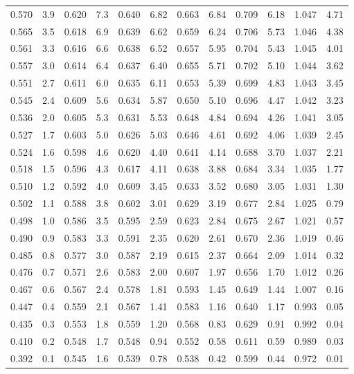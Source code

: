 \documentclass[a4paper,11pt]{article}
\begin{document}
\begin{table}[H]
{\begin{tabular}{|cc|cc|cc|cc|cc|cc|}
0.570 & 3.9 & 0.620 & 7.3 & 0.640 & 6.82 & 0.663 & 6.84 & 0.709 & 6.18 & 1.047 & 4.71 \\
0.565 & 3.5 & 0.618 & 6.9 & 0.639 & 6.62 & 0.659 & 6.24 & 0.706 & 5.73 & 1.046 & 4.38 \\
0.561 & 3.3 & 0.616 & 6.6 & 0.638 & 6.52 & 0.657 & 5.95 & 0.704 & 5.43 & 1.045 & 4.01 \\
0.557 & 3.0 & 0.614 & 6.4 & 0.637 & 6.40 & 0.655 & 5.71 & 0.702 & 5.10 & 1.044 & 3.62 \\
0.551 & 2.7 & 0.611 & 6.0 & 0.635 & 6.11 & 0.653 & 5.39 & 0.699 & 4.83 & 1.043 & 3.45 \\
0.545 & 2.4 & 0.609 & 5.6 & 0.634 & 5.87 & 0.650 & 5.10 & 0.696 & 4.47 & 1.042 & 3.23 \\
0.536 & 2.0 & 0.605 & 5.3 & 0.631 & 5.53 & 0.648 & 4.84 & 0.694 & 4.26 & 1.041 & 3.05 \\
0.527 & 1.7 & 0.603 & 5.0 & 0.626 & 5.03 & 0.646 & 4.61 & 0.692 & 4.06 & 1.039 & 2.45 \\
0.524 & 1.6 & 0.598 & 4.6 & 0.620 & 4.40 & 0.641 & 4.14 & 0.688 & 3.70 & 1.037 & 2.21 \\
0.518 & 1.5 & 0.596 & 4.3 & 0.617 & 4.11 & 0.638 & 3.88 & 0.684 & 3.34 & 1.035 & 1.77 \\
0.510 & 1.2 & 0.592 & 4.0 & 0.609 & 3.45 & 0.633 & 3.52 & 0.680 & 3.05 & 1.031 & 1.30 \\
0.502 & 1.1 & 0.588 & 3.8 & 0.602 & 3.01 & 0.629 & 3.19 & 0.677 & 2.84 & 1.025 & 0.79 \\
0.498 & 1.0 & 0.586 & 3.5 & 0.595 & 2.59 & 0.623 & 2.84 & 0.675 & 2.67 & 1.021 & 0.57 \\
0.490 & 0.9 & 0.583 & 3.3 & 0.591 & 2.35 & 0.620 & 2.61 & 0.670 & 2.36 & 1.019 & 0.46 \\
0.485 & 0.8 & 0.577 & 3.0 & 0.587 & 2.19 & 0.615 & 2.37 & 0.664 & 2.09 & 1.014 & 0.32 \\
0.476 & 0.7 & 0.571 & 2.6 & 0.583 & 2.00 & 0.607 & 1.97 & 0.656 & 1.70 & 1.012 & 0.26 \\
0.467 & 0.6 & 0.567 & 2.4 & 0.578 & 1.81 & 0.593 & 1.45 & 0.649 & 1.44 & 1.007 & 0.16 \\
0.447 & 0.4 & 0.559 & 2.1 & 0.567 & 1.41 & 0.583 & 1.16 & 0.640 & 1.17 & 0.993 & 0.05 \\
0.435 & 0.3 & 0.553 & 1.8 & 0.559 & 1.20 & 0.568 & 0.83 & 0.629 & 0.91 & 0.992 & 0.04 \\
0.410 & 0.2 & 0.548 & 1.7 & 0.548 & 0.94 & 0.552 & 0.58 & 0.611 & 0.59 & 0.989 & 0.03 \\
0.392 & 0.1 & 0.545 & 1.6 & 0.539 & 0.78 & 0.538 & 0.42 & 0.599 & 0.44 & 0.972 & 0.01 \\

\end{tabular}}
\end{table}
\end{document}
